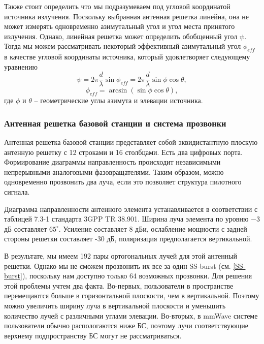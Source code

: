 Также стоит определить что мы подразумеваем под угловой координатой источника излучения. Поскольку выбранная антенная решетка линейна, она не может измерять одновременно азимутальный угол и угол места принятого излучения.
Однако, линейная решетка может определить обобщенный угол $\psi$. Тогда мы можем рассматривать некоторый эффективный азимутальный угол $\phi_{eff}$ в качестве угловой координаты источника, который удовлетворяет следующему уравнению
\begin{equation}
    \label{eq:4.1}
    \psi = 2\pi \frac{d}{\lambda} \sin \phi_{eff} = 2\pi \frac{d}{\lambda} \sin\phi \cos{\theta},
\end{equation}
\begin{equation}
    \label{eq:4.2}
    \phi_{eff} = \arcsin(\sin \phi \cos \theta),
\end{equation}
где $\phi$ и $\theta$ -- геометрические углы азимута и элевации источника.

\subsubsection{Антенная решетка базовой станции и система прозвонки}

Антенная решетка базовой станции представляет собой эквидистантную плоскую антенную решетку с 12 строками и 16 столбцами.
Есть два цифровых порта. Формирование диаграммы направленность происходит независимыми непрерывными аналоговыми фазовращателями. Таким образом, можно одновременно
прозвонить два луча, если это позволяет структура пилотного сигнала.

Диаграмма направленности антенного элемента устанавливается в соответствии с
таблицей 7.3-1 стандарта 3GPP TR 38.901. Ширина луча элемента по уровню $-3$ дБ составляет
$65^\circ$. Усиление составляет 8 дБи, ослабление мощности с задней стороны решетки составляет
-30 дБ, поляризация предполагается вертикальной.

В результате, мы имеем 192 пары ортогональных лучей для этой антенный решетки. Однако мы не сможем прозвонить их все за один SS-burst (см. \ref{SS-burst}), поскольку
нам доступно только 64 возможных прозвонки. Для решения этой проблемы учтем два факта.
Во-первых, пользователи в пространстве перемещаются больше в горизонтальной
плоскости, чем в вертикальной. Поэтому можно увеличить ширину луча в
вертикальной плоскости и уменьшить количество лучей с различными углами
элевации.
Во-вторых, в mmWave системе пользователи обычно распологаются ниже БС, поэтому
лучи соответствующие верхнему подпространству БС могут не рассматриваться.

